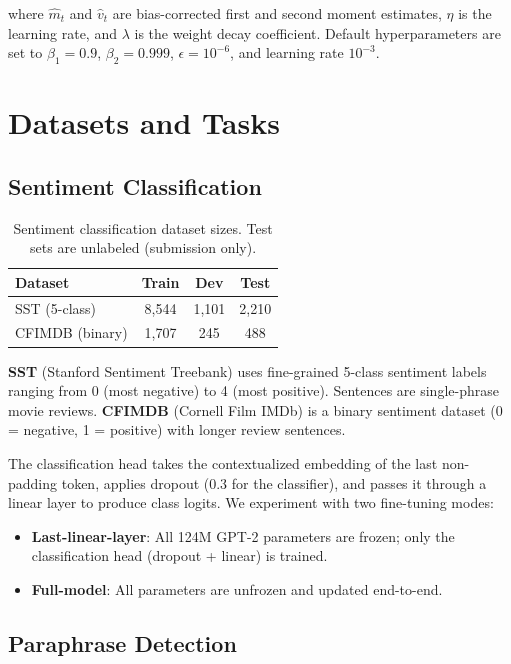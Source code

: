 \documentclass[11pt,a4paper]{article}
\begin{document}
where $\hat{m}_t$ and $\hat{v}_t$ are bias-corrected first and second moment estimates, $\eta$ is the learning rate, and $\lambda$ is the weight decay coefficient. Default hyperparameters are set to $\beta_1=0.9$, $\beta_2=0.999$, $\epsilon=10^{-6}$, and learning rate $10^{-3}$.

\section{Datasets and Tasks}

\subsection{Sentiment Classification}

\begin{table}[H]
\centering
\begin{tabular}{lccc}
\toprule
\textbf{Dataset} & \textbf{Train} & \textbf{Dev} & \textbf{Test} \\
\midrule
SST (5-class) & 8,544 & 1,101 & 2,210 \\
CFIMDB (binary) & 1,707 & 245 & 488 \\
\bottomrule
\end{tabular}
\caption{Sentiment classification dataset sizes. Test sets are unlabeled (submission only).}
\label{tab:sent}
\end{table}

\textbf{SST} (Stanford Sentiment Treebank) uses fine-grained 5-class sentiment labels ranging from 0 (most negative) to 4 (most positive). Sentences are single-phrase movie reviews. \textbf{CFIMDB} (Cornell Film IMDb) is a binary sentiment dataset (0 = negative, 1 = positive) with longer review sentences.

The classification head takes the contextualized embedding of the last non-padding token, applies dropout (0.3 for the classifier), and passes it through a linear layer to produce class logits. We experiment with two fine-tuning modes:
\begin{itemize}[nosep]
  \item \textbf{Last-linear-layer}: All 124M GPT-2 parameters are frozen; only the classification head (dropout + linear) is trained.
  \item \textbf{Full-model}: All parameters are unfrozen and updated end-to-end.
\end{itemize}

\subsection{Paraphrase Detection}
\end{document}
